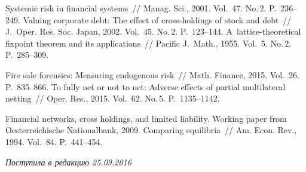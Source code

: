 


 \begin{multicols}{2}

\renewcommand{\bibname}{\protect\rmfamily Литература}

{\small\frenchspacing
{%
\begin{thebibliography}{9}
 Systemic risk in financial systems~// 
Manag. Sci., 2001. Vol.~47. No.\,2. P.~236--249.
 Valuing corporate debt: The effect of cross-holdings of stock and debt~// 
J.~Oper. Res. Soc. Japan, 2002. Vol.~45. No.\,2. P.~123--144.
 A~lattice-theoretical fixpoint theorem and its applications~// 
Pacific J.~Math., 1955. Vol.~5. No.\,2. P.~285--309.

 Fire sale forensics: Measuring endogenous risk~// 
Math.  Finance, 2015. Vol.~26. P.~835--866. %
 To fully net or not to net: 
Adverse effects of partial multilateral netting~// Oper. Res., 2015. Vol.~62.
No.\,5. P.~1135--1142.

 Financial networks, cross holdings, and limited liability. 
Working paper from Oesterreichische Nationalbank, 2009.
 Comparing equilibria~// Am. Econ. Rev., 1994. 
Vol.~84. P.~441--454.


\end{thebibliography}
} }

\end{multicols}

 \label{end\stat}

 \vspace*{-3pt}

\hfill{\small\textit{Поступила в редакцию  25.09.2016}}
\renewcommand{\figurename}{\protect\bf Рис.}
\renewcommand{\tablename}{\protect\bf Таблица}